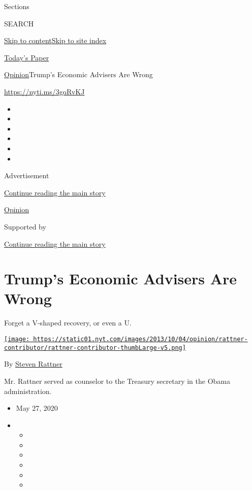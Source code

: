 Sections

SEARCH

\protect\hyperlink{site-content}{Skip to
content}\protect\hyperlink{site-index}{Skip to site index}

\href{https://myaccount.nytimes.com/auth/login?response_type=cookie\&client_id=vi}{}

\href{https://www.nytimes.com/section/todayspaper}{Today's Paper}

\href{/section/opinion}{Opinion}\textbar{}Trump's Economic Advisers Are
Wrong

\href{https://nyti.ms/3gqRvKJ}{https://nyti.ms/3gqRvKJ}

\begin{itemize}
\item
\item
\item
\item
\item
\item
\end{itemize}

Advertisement

\protect\hyperlink{after-top}{Continue reading the main story}

\href{/section/opinion}{Opinion}

Supported by

\protect\hyperlink{after-sponsor}{Continue reading the main story}

\hypertarget{trumps-economic-advisers-are-wrong}{%
\section{Trump's Economic Advisers Are
Wrong}\label{trumps-economic-advisers-are-wrong}}

Forget a V-shaped recovery, or even a U.

\href{https://www.nytimes.com/topic/person/steven-rattner}{\texttt{[image: https://static01.nyt.com/images/2013/10/04/opinion/rattner-contributor/rattner-contributor-thumbLarge-v5.png]}}

By \href{https://www.nytimes.com/topic/person/steven-rattner}{Steven
Rattner}

Mr. Rattner served as counselor to the Treasury secretary in the Obama
administration.

\begin{itemize}
\item
  May 27, 2020
\item
  \begin{itemize}
  \item
  \item
  \item
  \item
  \item
  \item
  \end{itemize}
\end{itemize}

